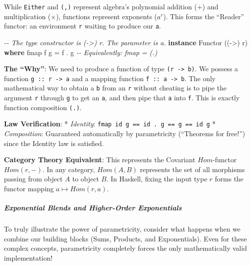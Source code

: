 \documentclass[
]{article}
\newenvironment{Shaded}{}{}
\newcommand{\CommentTok}[1]{\textcolor[rgb]{0.38,0.63,0.69}{\textit{#1}}}
\newcommand{\DataTypeTok}[1]{\textcolor[rgb]{0.56,0.13,0.00}{#1}}
\newcommand{\FunctionTok}[1]{\textcolor[rgb]{0.02,0.16,0.49}{#1}}
\newcommand{\KeywordTok}[1]{\textcolor[rgb]{0.00,0.44,0.13}{\textbf{#1}}}
\newcommand{\NormalTok}[1]{#1}
\newcommand{\OperatorTok}[1]{\textcolor[rgb]{0.40,0.40,0.40}{#1}}
\newcommand{\OtherTok}[1]{\textcolor[rgb]{0.00,0.44,0.13}{#1}}
\begin{document}
While \texttt{Either} and \texttt{(,)} represent algebra's polynomial
addition (\(+\)) and multiplication (\(\times\)), functions represent
exponents (\(a^r\)). This forms the ``Reader'' functor: an environment
\texttt{r} waiting to produce our \texttt{a}.

\begin{Shaded}
\begin{Highlighting}[]
\CommentTok{{-}{-} The type constructor is \textasciigrave{}({-}\textgreater{}) r\textasciigrave{}. The parameter is \textasciigrave{}a\textasciigrave{}.}
\KeywordTok{instance} \DataTypeTok{Functor}\NormalTok{ ((}\OtherTok{{-}\textgreater{}}\NormalTok{) r) }\KeywordTok{where}
    \FunctionTok{fmap}\NormalTok{ f g }\OtherTok{=}\NormalTok{ f }\OperatorTok{.}\NormalTok{ g }
    \CommentTok{{-}{-} Equivalently: fmap = (.)}
\end{Highlighting}
\end{Shaded}

\textbf{The ``Why''}: We need to produce a function of type
\texttt{(r\ -\textgreater{}\ b)}. We possess a function
\texttt{g\ ::\ r\ -\textgreater{}\ a} and a mapping function
\texttt{f\ ::\ a\ -\textgreater{}\ b}. The only mathematical way to
obtain a \texttt{b} from an \texttt{r} without cheating is to pipe the
argument \texttt{r} through \texttt{g} to get an \texttt{a}, and then
pipe that \texttt{a} into \texttt{f}. This is exactly function
composition \texttt{(.)}.

\textbf{Law Verification}: * \emph{Identity}:
\texttt{fmap\ id\ g\ ==\ id\ .\ g\ ==\ g\ ==\ id\ g} *
\emph{Composition}: Guaranteed automatically by parametricity
(``Theorems for free!'') since the Identity law is satisfied.

\textbf{Category Theory Equivalent}: This represents the Covariant
\(Hom\)-functor \(Hom(r, -)\). In any category, \(Hom(A, B)\) represents
the set of all morphisms passing from object \(A\) to object \(B\). In
Haskell, fixing the input type \(r\) forms the functor mapping
\(a \mapsto Hom(r, a)\).

\subparagraph{Exponential Blends and Higher-Order
Exponentials}\label{exponential-blends-and-higher-order-exponentials}

To truly illustrate the power of parametricity, consider what happens
when we combine our building blocks (Sums, Products, and Exponentials).
Even for these complex concepts, parametricity completely forces the
only mathematically valid implementation!
\end{document}

